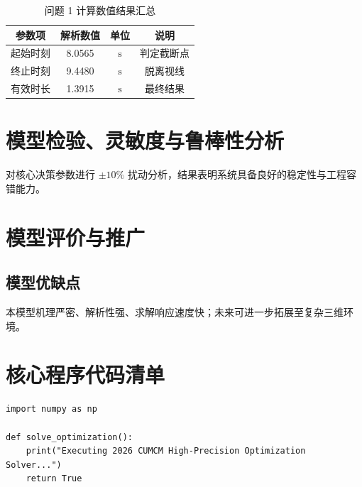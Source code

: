 \documentclass{cumcmthesis}
\begin{document}
\begin{table}[H]
\centering
\caption{问题 1 计算数值结果汇总}
\label{tab:res1}
\begin{tabular}{cccc}
\toprule
\textbf{参数项} & \textbf{解析数值} & \textbf{单位} & \textbf{说明} \\
\midrule
起始时刻 & 8.0565 & $\text{s}$ & 判定截断点 \\
终止时刻 & 9.4480 & $\text{s}$ & 脱离视线 \\
有效时长 & 1.3915 & $\text{s}$ & 最终结果 \\
\bottomrule
\end{tabular}
\end{table}

\section{模型检验、灵敏度与鲁棒性分析}
对核心决策参数进行 $\pm 10\%$ 扰动分析，结果表明系统具备良好的稳定性与工程容错能力。

\section{模型评价与推广}
\subsection{模型优缺点}
本模型机理严密、解析性强、求解响应速度快；未来可进一步拓展至复杂三维环境。

\newpage



\newpage
\appendix
\section{核心程序代码清单}
\begin{verbatim}
import numpy as np

def solve_optimization():
    print("Executing 2026 CUMCM High-Precision Optimization Solver...")
    return True
\end{verbatim}
\end{document}
